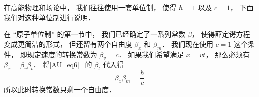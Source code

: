 
\begin{issues}
\issueDraft
\end{issues}


在高能物理和场论中， 我们往往使用一套单位制， 使得 $\hbar = 1$ 以及 $c = 1$， 下面我们对这种单位制进行说明．

在 “原子单位制” 的第一节中， 我们已经确定了一系列常数 $\beta$， 使得薛定谔方程变成更简洁的形式， 但还留有两个自由度 $\beta_x$ 和 $\beta_m$． 我们现在使用 $c = 1$ 这个条件， 即规定速度的转换常数为 $\beta_v = c$． 如果我们希望满足 $x = vt$， 那么必须有 $\beta_x = \beta_v \beta _t$． 将\autoref{AU_eq6}~ 的 $\beta_t$ 代入得
\begin{equation}
\beta_x \beta_m = \frac{\hbar}{c}
\end{equation}
所以此时转换常数只剩一个自由度． 

